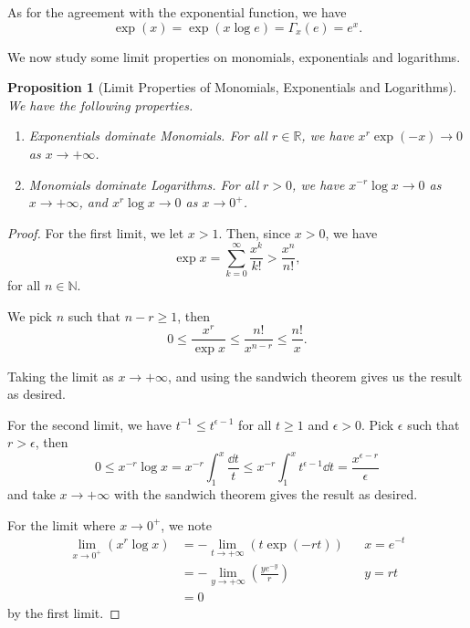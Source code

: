 \documentclass[11pt]{article}
\numberwithin{equation}{section}
\newtheorem{proposition}[theorem]{Proposition}
\theoremstyle{definition}
\theoremstyle{remark}
\newcommand{\pqty}[1]{\left(#1\right)}
\newcommand{\RR}{\mathbb R}
\newcommand{\NN}{\mathbb N}
\newcommand{\plusinfty}{+\infty}
\begin{document}
As for the agreement with the exponential function, we have
\[
    \exp\pqty{x} = \exp\pqty{x \log e} = \Gamma_x \pqty{e} = e^x.
\]

We now study some limit properties on monomials, exponentials and logarithms.

\begin{proposition}[Limit Properties of Monomials, Exponentials and Logarithms]\label{analysis-unit-0227}
    \label{prop:lim-prop-monomial-exponential-logarithm}%
    We have the following properties.
    \begin{enumerate}
        \item \emph{Exponentials dominate Monomials.} For all \(r \in \RR\), we have \(x^r \exp\pqty{-x} \to 0\) as \(x \to \plusinfty\).
        \item \emph{Monomials dominate Logarithms.} For all \(r > 0\), we have \(x^{-r} \log x \to 0\) as \(x \to \plusinfty\), and \(x^r \log x \to 0\) as \(x \to 0^+\).
    \end{enumerate}
\end{proposition}

\begin{proof}
    For the first limit, we let \(x > 1\). Then, since \(x > 0\), we have
    \[
        \exp x = \sum_{k = 0}^{\infty} \frac{x^k}{k!} > \frac{x^n}{n!},
    \]  
    for all \(n \in \NN\).

    We pick \(n\) such that \(n - r \geq 1\), then
    \[
        0 \leq \frac{x^r}{\exp x} \leq \frac{n!}{x^{n - r}} \leq \frac{n!}{x}.
    \]

    Taking the limit as \(x \to \plusinfty\), and using the sandwich theorem gives us the result as desired.

    For the second limit, we have \(t^{-1} \leq t^{\epsilon - 1}\) for all \(t \geq 1\) and \(\epsilon > 0\). Pick \(\epsilon\) such that \(r > \epsilon\), then
    \[
        0 \leq x^{-r} \log x = x^{-r} \int_{1}^{x} \frac{\dd{t}}{t} \leq x^{-r} \int_{1}^{x} t^{\epsilon - 1} \dd{t} = \frac{x^{\epsilon - r}}{\epsilon}
    \]
    and take \(x \to \plusinfty\) with the sandwich theorem gives the result as desired.

    For the limit where \(x \to 0^+\), we note
    \begin{align*}
        \lim_{x \to 0^+} \pqty{x^r \log x} &= - \lim_{t \to \plusinfty} \pqty{t \exp \pqty{- rt}} && x = e^{-t} \\
        &= - \lim_{y \to \plusinfty} \pqty{\frac{y e^{-y}}{r}} && y = rt \\
        &= 0
    \end{align*}
    by the first limit.
\end{proof}
\end{document}
